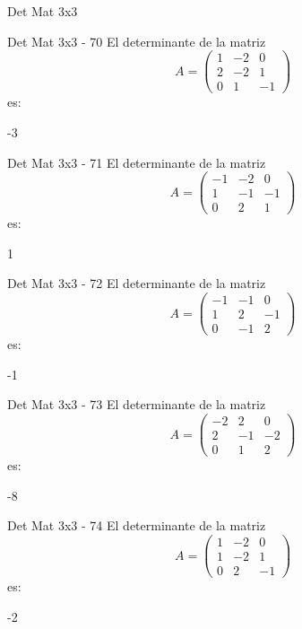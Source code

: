 \documentclass[a4,11pt]{aleph-notas}
\begin{document}
\begin{quiz}{Det Mat 3x3}
\begin{numerical}[tolerance=0]%
    {Det Mat 3x3 - 70}
    El determinante de la matriz
    \[
        A = \begin{pmatrix} 1 & -2 & 0 \\ 2 & -2 & 1 \\ 0 & 1 & -1 \end{pmatrix}
    \]
    es:
    \item[] -3
\end{numerical}

\begin{numerical}[tolerance=0]%
    {Det Mat 3x3 - 71}
    El determinante de la matriz
    \[
        A = \begin{pmatrix} -1 & -2 & 0 \\ 1 & -1 & -1 \\ 0 & 2 & 1 \end{pmatrix}
    \]
    es:
    \item[] 1
\end{numerical}

\begin{numerical}[tolerance=0]%
    {Det Mat 3x3 - 72}
    El determinante de la matriz
    \[
        A = \begin{pmatrix} -1 & -1 & 0 \\ 1 & 2 & -1 \\ 0 & -1 & 2 \end{pmatrix}
    \]
    es:
    \item[] -1
\end{numerical}

\begin{numerical}[tolerance=0]%
    {Det Mat 3x3 - 73}
    El determinante de la matriz
    \[
        A = \begin{pmatrix} -2 & 2 & 0 \\ 2 & -1 & -2 \\ 0 & 1 & 2 \end{pmatrix}
    \]
    es:
    \item[] -8
\end{numerical}

\begin{numerical}[tolerance=0]%
    {Det Mat 3x3 - 74}
    El determinante de la matriz
    \[
        A = \begin{pmatrix} 1 & -2 & 0 \\ 1 & -2 & 1 \\ 0 & 2 & -1 \end{pmatrix}
    \]
    es:
    \item[] -2
\end{numerical}


\end{quiz}
\end{document}
